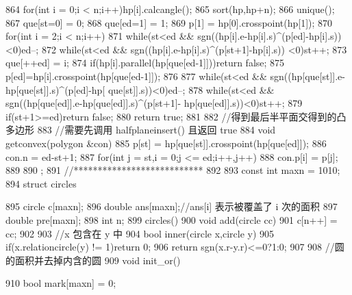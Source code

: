 \documentclass[11pt]{article}
\begin{document}
\begin{Code}
{{864              for(int i = 0;i < n;i++)hp[i].calcangle();
865              sort(hp,hp+n);
866              unique();
867              que[st=0] = 0;
868              que[ed=1] = 1;
869              p[1] = hp[0].crosspoint(hp[1]);
870              for(int i = 2;i < n;i++){
871                  while(st<ed && sgn((hp[i].e-hp[i].s)^(p[ed]-hp[i].s))
                        <0)ed--;
872                  while(st<ed && sgn((hp[i].e-hp[i].s)^(p[st+1]-hp[i].s))
                        <0)st++;
873                  que[++ed] = i;
874                  if(hp[i].parallel(hp[que[ed-1]]))return false;
875                  p[ed]=hp[i].crosspoint(hp[que[ed-1]]);
876              }
877              while(st<ed && sgn((hp[que[st]].e-hp[que[st]].s)^(p[ed]-hp[
                    que[st]].s))<0)ed--;
878              while(st<ed && sgn((hp[que[ed]].e-hp[que[ed]].s)^(p[st+1]-
                    hp[que[ed]].s))<0)st++;
879              if(st+1>=ed)return false;
880              return true;
881       }
882       //得到最后半平面交得到的凸多边形
883       //需要先调用 halfplaneinsert() 且返回 true
884       void getconvex(polygon &con){
885           p[st] = hp[que[st]].crosspoint(hp[que[ed]]);
886           con.n = ed-st+1;
887           for(int j = st,i = 0;j <= ed;i++,j++)
888               con.p[i] = p[j];
889       }
890   };
891   //***************************
892
893   const int maxn = 1010;
894   struct circles{
895       circle c[maxn];
896       double ans[maxn];//ans[i] 表示被覆盖了 i 次的面积
897       double pre[maxn];
898       int n;
899       circles(){}
900       void add(circle cc){
901           c[n++] = cc;
902       }
903       //x 包含在 y 中
904       bool inner(circle x,circle y){
905           if(x.relationcircle(y) != 1)return 0;
906           return sgn(x.r-y.r)<=0?1:0;
907       }
908       //圆的面积并去掉内含的圆
909       void init_or(){
910           bool mark[maxn] = {0};


}}
\end{Code}
\end{document}
